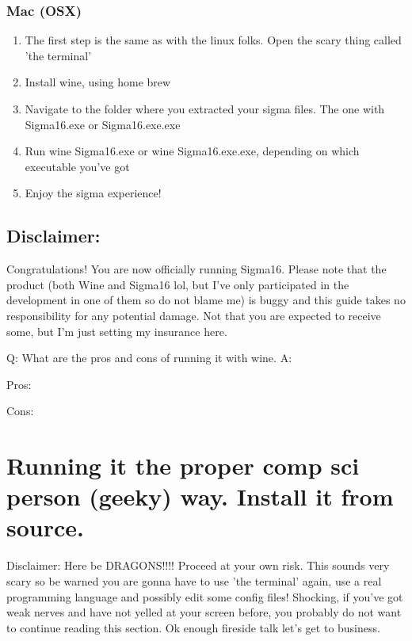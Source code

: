 \documentclass{article}
\begin{document}
 \subsubsection{Mac (OSX)}
 \begin{enumerate}
      
   \item The first step is the same as with the linux folks. Open the scary thing called 'the terminal'
   \item Install wine, using home brew
   \item Navigate to the folder where you extracted your sigma files. The one with Sigma16.exe or Sigma16.exe.exe
   \item Run wine Sigma16.exe or wine Sigma16.exe.exe, depending on which executable you've got
   \item Enjoy the sigma experience!
\end{enumerate}

\subsection{Disclaimer:}
 Congratulations! You are now officially running Sigma16. Please note that the product (both Wine and Sigma16 lol, but I've only participated in the development in one of them so do not blame me) is buggy and this guide takes no responsibility for any potential damage. Not that you are expected to receive some, but I'm just setting my insurance here.

Q: What are the pros and cons of running it with wine.
A:

 Pros:


 Cons:


\section{Running it the proper comp sci person (geeky) way. Install it from source.}
Disclaimer:
 Here be DRAGONS!!!! Proceed at your own risk. This sounds very scary so be warned you are gonna have to use 'the terminal' again, use a real programming language and possibly edit some config files! Shocking, if you've got weak nerves and have not yelled at your screen before, you probably do not want to continue reading this section. Ok enough fireside talk let's get to business.
\end{document}
